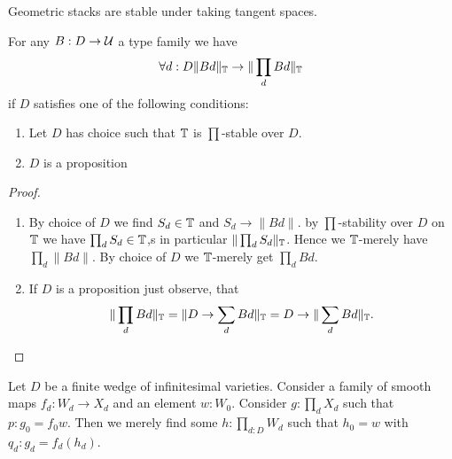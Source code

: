 \begin{corollary}
	Geometric stacks are stable under taking tangent spaces.
\end{corollary}
\begin{lemma}{\label{lemma:TinyStrongLocalChoice}}
 	For any $B : D \to \mathcal{U}$ a type family we have
	\[
	\forall d:D \|B d\|_{\mathbb{T}} \to \| \prod_d B d\|_{\mathbb{T}}
	\]
	if $D$ satisfies one of the following conditions:
	\begin{enumerate}
		\item Let $D$ has choice such that $\mathbb{T}$ is $\prod$-stable over $D$. 
		\item $D$ is a proposition
\end{enumerate}		
\end{lemma}
\begin{proof}
	\begin{enumerate}
		\item 
	By choice of $D$ we find $S_d \in \mathbb{T}$ and $S_d \to \|B d\|$. by $\prod$-stability over $D$ on $\mathbb{T}$ we have $\prod_d S_d \in \mathbb{T}$,s  in particular $\| \prod_d S_d \|_{\mathbb{T}}$. Hence we $\mathbb{T}$-merely have $\prod_d \| B d\|.$ By choice of $D$ we $\mathbb{T}$-merely get $\prod_d B d$. 
	\item 	If $D$ is a proposition just observe, that 
	\[\| \prod_d B d \|_{\mathbb{T}}= \| D \to \sum_d B d \|_{\mathbb{T}} = D \to \|\sum_d B d\|_{\mathbb{T}}.\]
		\end{enumerate}
\end{proof}
\begin{lemma}
	Let $D$ be a finite wedge of infinitesimal varieties. Consider a family of smooth maps $f_d : W_d \to X_d$ and an element $w : W_0$.
	Consider $g : \prod_d X_d$ such that $p : g_0 = f_0 w$. Then we merely find some $h : \prod_{d: D} W_d$ such that $h_0 = w$ with $q_d : g_d = f_d (h_d) $.
	
\end{lemma}
